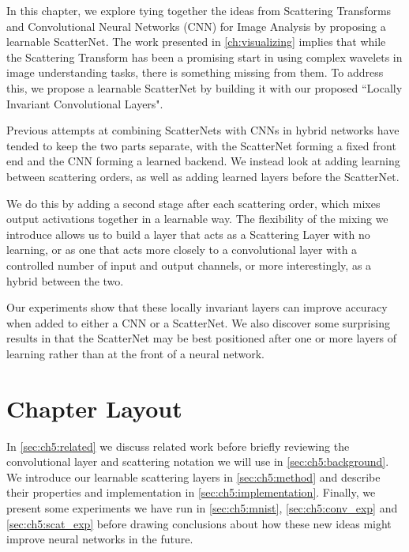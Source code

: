 In this chapter, we explore tying together the ideas from Scattering Transforms
and Convolutional Neural Networks (CNN) for Image Analysis by proposing a learnable
ScatterNet. The work presented in \autoref{ch:visualizing} implies that while the Scattering
Transform has been a promising start in using complex wavelets in image
understanding tasks, there is something missing from them. To address this, we
propose a learnable ScatterNet by building it with our proposed ``Locally Invariant
Convolutional Layers".

Previous attempts at combining ScatterNets with CNNs in hybrid networks
\cite{oyallon_scaling_2017, singh_scatternet_2018} have
tended to keep the two parts separate, with the ScatterNet forming a fixed front
end and the CNN forming a learned backend. We instead look at adding learning
between scattering orders, as well as adding learned layers before the
ScatterNet.

%
We do this by adding a second stage after each scattering order, which mixes output
activations together in a learnable way. The flexibility of the mixing we introduce allows
us to build a layer that acts as a Scattering Layer with no learning, or
as one that acts more closely to a convolutional layer with a controlled number of input
and output channels, or more interestingly, as a hybrid between the two.

Our experiments show that these locally invariant layers can improve
accuracy when added to either a CNN or a ScatterNet.  We also discover some
surprising results in that the ScatterNet may be best positioned after one or
more layers of learning rather than at the front of a neural network.

\section{Chapter Layout}
In \autoref{sec:ch5:related} we discuss related work before briefly
reviewing the convolutional layer and scattering notation we will use in \autoref{sec:ch5:background}.
We introduce our learnable scattering layers in \autoref{sec:ch5:method} and describe their
properties and implementation in \autoref{sec:ch5:implementation}.
Finally, we present some experiments we have run in \autoref{sec:ch5:mnist},
\autoref{sec:ch5:conv_exp} and \autoref{sec:ch5:scat_exp} before
drawing conclusions about how these new ideas might improve neural networks in the
future.
